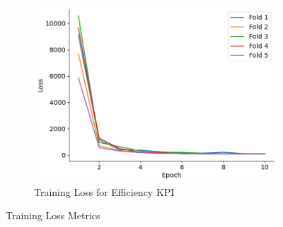 \documentclass{report} %
\begin{document}
\begin{figure}[H]
\begin{subfigure}{0.32\textwidth}
        \centering
        \includegraphics[width=\textwidth]{./ReportImages/train_loss_y2.png}
        \caption{\centering Training Loss for Efficiency \ac{KPI}}
        \label{fig:Training Loss for Efficiency grid}
    \end{subfigure}
    \caption{Training Loss Metrics}
    \label{fig:Training Loss Metrics}
\end{figure}
\end{document}
